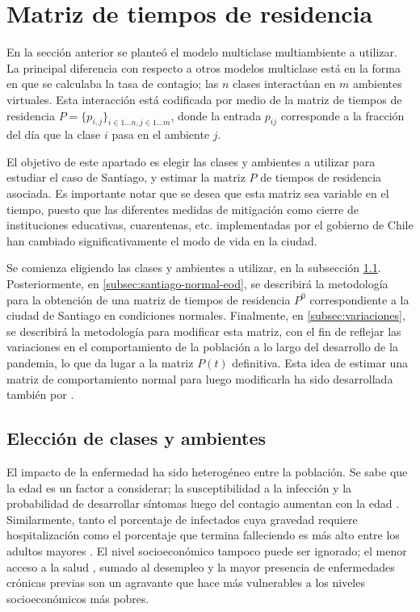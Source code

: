 \section{Matriz de tiempos de residencia}\label{met:matriz}

En la sección anterior se planteó el modelo multiclase multiambiente a utilizar. La principal diferencia con respecto a otros modelos multiclase está en la forma en que se calculaba la tasa de contagio; las \(n\) clases interactúan en \(m\) ambientes virtuales. Esta interacción está codificada por medio de la matriz de tiempos de residencia \( P =\{p_{i,j}\}_{i \in 1 \dots n, j \in 1 \dots m}\), donde la entrada \(p_{ij}\) corresponde a la fracción del día que la clase \(i\) pasa en el ambiente \(j\).

El objetivo de este apartado es elegir las clases y ambientes a utilizar para estudiar el caso de Santiago, y estimar la matriz \(P\) de tiempos de residencia asociada. Es importante notar que se desea que esta matriz sea variable en el tiempo, puesto que las diferentes medidas de mitigación como cierre de instituciones educativas, cuarentenas, etc. implementadas por el gobierno de Chile han cambiado significativamente el modo de vida en la ciudad.  

Se comienza eligiendo las clases y ambientes a utilizar, en la subsección \ref{subsec:eleccion-clases-ambientes}. Posteriormente, en \ref{subsec:santiago-normal-eod}, se describirá la metodología para la obtención de una matriz de tiempos de residencia \(P^0\) correspondiente a la ciudad de Santiago en condiciones normales. Finalmente, en \ref{subsec:variaciones}, se describirá la metodología para modificar esta matriz, con el fin de reflejar las variaciones en el comportamiento de la población a lo largo del desarrollo de la pandemia, lo que da lugar a la matriz \(P(t)\) definitiva. Esta idea de estimar una matriz de comportamiento normal para luego modificarla ha sido desarrollada también por \cite{Lai2020}.


\subsection{Elección de clases y ambientes}\label{subsec:eleccion-clases-ambientes}

El impacto de la enfermedad ha sido heterogéneo entre la población. Se sabe que la edad es un factor a considerar; la susceptibilidad a la infección y la probabilidad de desarrollar síntomas luego del contagio aumentan con la edad \cite{Davies2020}. Similarmente, tanto el porcentaje de infectados cuya gravedad requiere hospitalización como el porcentaje que termina falleciendo es más alto entre los adultos mayores \cite{Verity2020}. El nivel socioeconómico tampoco puede ser ignorado; el menor acceso a la salud \cite{Wang2020}, sumado al desempleo y la mayor presencia de enfermedades crónicas previas \cite{Ahmed2020} son un agravante que hace más vulnerables a los niveles socioeconómicos más pobres.

